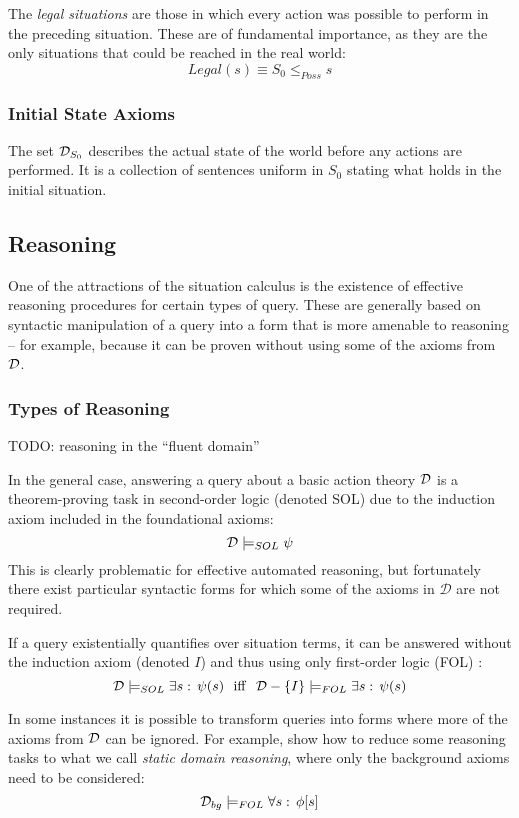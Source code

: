 The \emph{legal situations} are those in which every action was possible
to perform in the preceding situation. These are of fundamental importance,
as they are the only situations that could be reached in the real
world:\[
Legal(s)\equiv S_{0}\leq_{Poss}s\]



\subsubsection{Initial State Axioms}

The set $\mathcal{D}_{S_{0}}$ describes the actual state of the world before
any actions are performed. It is a collection of sentences uniform
in $S_{0}$ stating what holds in the initial situation.


\subsection{Reasoning}

One of the attractions of the situation calculus is the existence
of effective reasoning procedures for certain types of query. These
are generally based on syntactic manipulation of a query into a form
that is more amenable to reasoning -- for example, because it can
be proven without using some of the axioms from $\mathcal{D}$.


\subsubsection{Types of Reasoning}

TODO: reasoning in the {}``fluent domain''

In the general case, answering a query about a basic action theory
$\mathcal{D}$ is a theorem-proving task in second-order logic (denoted SOL)
due to the induction axiom included in the foundational axioms:\[
\mathcal{D}\models_{SOL}\psi\]
 This is clearly problematic for effective automated reasoning, but
fortunately there exist particular syntactic forms for which some
of the axioms in $\mathcal{D}$ are not required.

If a query existentially quantifies over situation terms, it can be
answered without the induction axiom (denoted $I$) and thus using
only first-order logic (FOL) \citep{pirri99contributions_sitcalc}:\[
\mathcal{D}\models_{SOL}\exists s:\,\psi(s)\,\,\,\,\mathrm{iff}\,\,\,\,\mathcal{D}-\{I\}\models_{FOL}\exists s:\,\psi(s)\]


In some instances it is possible to transform queries into forms where
more of the axioms from $\mathcal{D}$ can be ignored. For example, \citet{Lin94-StateConstraints}
show how to reduce some reasoning tasks to what we call \emph{static
domain reasoning}, where only the background axioms need to be considered:\[
\mathcal{D}_{bg}\models_{FOL}\forall s:\,\phi[s]\]


